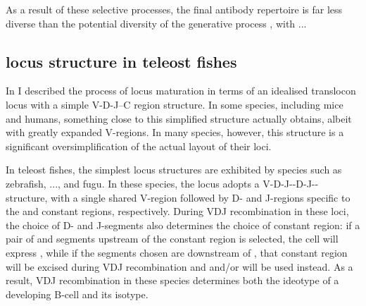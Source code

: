 
As a result of these selective processes, the final antibody repertoire is far less diverse than the potential diversity of the generative process \parencite{dunnwalters2010bcellageing}, with ...


\subsection{\igh{} locus structure in teleost fishes}

In  I described the process of \igh{} locus maturation in terms of an idealised translocon locus with a simple V-D-J--C region structure. In some species, including mice and humans, something close to this simplified structure actually obtains, albeit with greatly expanded V-regions. %
In many species, however, this structure is a significant oversimplification of the actual layout of their \igh{} loci.

In teleost fishes, the simplest locus structures are exhibited by species such as zebrafish, ..., and fugu. In these species, the \igh{} locus adopts a V-D-J-\cz{}-D-J-\cm{}-\cd{} structure, with a single shared V-region followed by D- and J-regions specific to the  and  constant regions, respectively. During VDJ recombination in these loci, the choice of D- and J-segments also determines the choice of constant region: if a pair of \dh and \jh segments upstream of the  constant region is selected, the cell will express , while if the segments chosen are downstream of , that constant region will be excised during VDJ recombination and  and/or  will be used instead. As a result, VDJ recombination in these species determines both the ideotype of a developing B-cell and its isotype.

